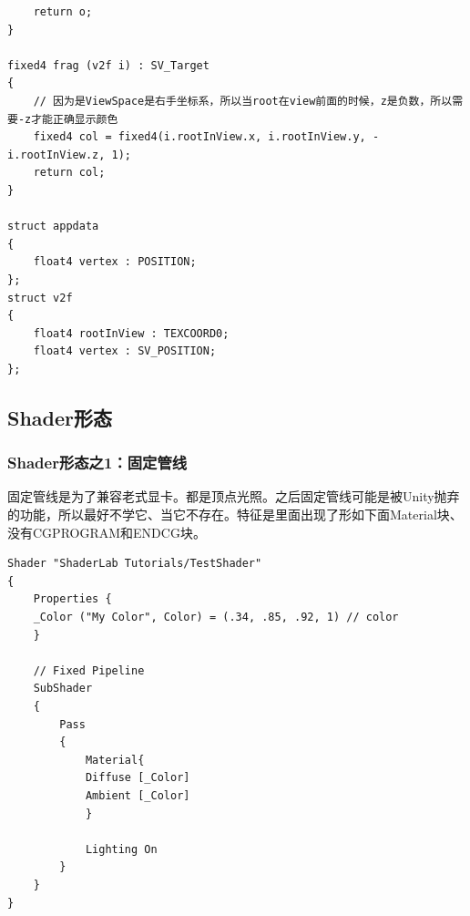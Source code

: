 \documentclass[9pt, b5paper]{article}
\begin{document}
\begin{itemize}
\begin{itemize}
\begin{verbatim}
    return o;
}

fixed4 frag (v2f i) : SV_Target
{
    // 因为是ViewSpace是右手坐标系，所以当root在view前面的时候，z是负数，所以需要-z才能正确显示颜色
    fixed4 col = fixed4(i.rootInView.x, i.rootInView.y, -i.rootInView.z, 1);
    return col;
}

struct appdata
{
    float4 vertex : POSITION;
};
struct v2f
{
    float4 rootInView : TEXCOORD0;
    float4 vertex : SV_POSITION;
};
\end{verbatim}
\end{itemize}
\end{itemize}

\subsection{Shader形态}
\label{sec:org7a841c4}

\subsubsection{Shader形态之1：固定管线}
\label{sec:org0f24bf9}
固定管线是为了兼容老式显卡。都是顶点光照。之后固定管线可能是被Unity抛弃的功能，所以最好不学它、当它不存在。特征是里面出现了形如下面Material块、没有CGPROGRAM和ENDCG块。
\begin{verbatim}
Shader "ShaderLab Tutorials/TestShader"
{
    Properties {
    _Color ("My Color", Color) = (.34, .85, .92, 1) // color
    }

    // Fixed Pipeline
    SubShader
    {
        Pass
        {
            Material{
            Diffuse [_Color]
            Ambient [_Color]
            }

            Lighting On
        }
    }
}
\end{verbatim}
\end{document}

